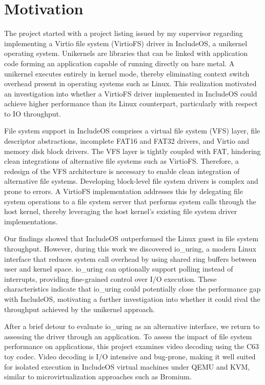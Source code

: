\documentclass[12pt, a4paper, oneside]{report}
\begin{document}
\chapter{Motivation}
\label{chap:motivation}

The project started with a project listing issued by my supervisor regarding
implementing a Virtio file system (VirtioFS) driver in IncludeOS, a unikernel
operating system.  Unikernels are libraries that can be linked with application
code forming an application capable of running directly on bare metal.  A
unikernel executes entirely in kernel mode, thereby eliminating context switch
overhead present in operating systems such as Linux.  This realization motivated
an investigation into whether a VirtioFS driver implemented in IncludeOS could
achieve higher performance than its Linux counterpart, particularly with respect
to IO throughput.

File system support in IncludeOS comprises a virtual file system (VFS) layer,
file descriptor abstractions, incomplete FAT16 and FAT32 drivers, and Virtio and
memory disk block drivers.  The VFS layer is tightly coupled with FAT, hindering
clean integrations of alternative file systems such as VirtioFS.  Therefore, a
redesign of the VFS architecture is necessary to enable clean integration of
alternative file systems.  Developing block-level file system drivers is complex
and prone to errors.  A VirtioFS implementation addresses this by delegating file
system operations to a file system server that performs system calls through the
host kernel, thereby leveraging the host kernel's existing file system driver
implementations.

Our findings showed that IncludeOS outperformed the Linux guest in file system
throughput.  However, during this work we discovered io\_uring, a modern Linux
interface that reduces system call overhead by using shared ring buffers between
user and kernel space.  io\_uring can optionally support polling instead of
interrupts, providing fine-grained control over I/O execution.  These
characteristics indicate that io\_uring could potentially close the performance
gap with IncludeOS, motivating a further investigation into whether it could
rival the throughput achieved by the unikernel approach.

After a brief detour to evaluate io\_uring as an alternative interface, we return
to assessing the driver through an application.  To assess the impact of file
system performance on applications, this project examines video decoding using
the C63 toy codec.  Video decoding is I/O intensive and bug-prone, making it
well suited for isolated execution in IncludeOS virtual machines under QEMU and
KVM, similar to microvirtualization approaches such as Bromium.
\end{document}
